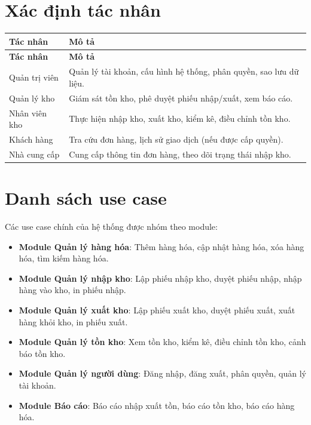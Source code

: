 \section{Xác định tác nhân}

\begin{longtable}{|p{3.5cm}|p{9cm}|}
\hline
\textbf{Tác nhân} & \textbf{Mô tả} \\
\hline
\endfirsthead
\hline
\textbf{Tác nhân} & \textbf{Mô tả} \\
\hline
\endhead
Quản trị viên & Quản lý tài khoản, cấu hình hệ thống, phân quyền, sao lưu dữ liệu. \\
\hline
Quản lý kho & Giám sát tồn kho, phê duyệt phiếu nhập/xuất, xem báo cáo. \\
\hline
Nhân viên kho & Thực hiện nhập kho, xuất kho, kiểm kê, điều chỉnh tồn kho. \\
\hline
Khách hàng & Tra cứu đơn hàng, lịch sử giao dịch (nếu được cấp quyền). \\
\hline
Nhà cung cấp & Cung cấp thông tin đơn hàng, theo dõi trạng thái nhập kho. \\
\hline
\end{longtable}

\section{Danh sách use case}

Các use case chính của hệ thống được nhóm theo module:

\begin{itemize}[leftmargin=1.5cm]
    \item \textbf{Module Quản lý hàng hóa}: Thêm hàng hóa, cập nhật hàng hóa, xóa hàng hóa, tìm kiếm hàng hóa.
    \item \textbf{Module Quản lý nhập kho}: Lập phiếu nhập kho, duyệt phiếu nhập, nhập hàng vào kho, in phiếu nhập.
    \item \textbf{Module Quản lý xuất kho}: Lập phiếu xuất kho, duyệt phiếu xuất, xuất hàng khỏi kho, in phiếu xuất.
    \item \textbf{Module Quản lý tồn kho}: Xem tồn kho, kiểm kê, điều chỉnh tồn kho, cảnh báo tồn kho.
    \item \textbf{Module Quản lý người dùng}: Đăng nhập, đăng xuất, phân quyền, quản lý tài khoản.
    \item \textbf{Module Báo cáo}: Báo cáo nhập xuất tồn, báo cáo tồn kho, báo cáo hàng hóa.
\end{itemize}

